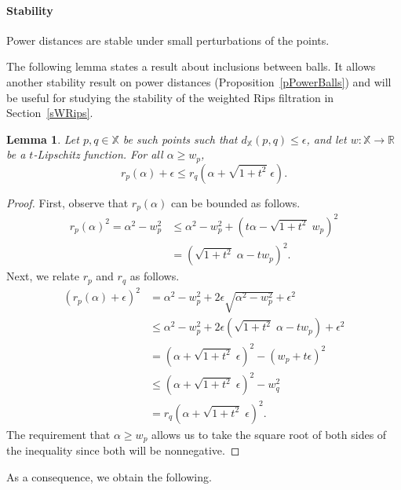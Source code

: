 \documentclass[a4paper]{article}
\newcommand\X{\mathbb{X}}
\newcommand\R{\mathbb{R}}
\newcommand\dX[2]{d_\X(#1,#2)}
\newtheorem{lemma}[theorem]{Lemma}
\begin{document}
\paragraph{Stability\\}
Power distances are stable under small perturbations of the points.



The following lemma states a result about inclusions between balls.
It allows another stability result on power distances (Proposition~\ref{pPowerBalls}) and will be useful for studying the stability of the weighted Rips filtration in Section~\ref{sWRips}.

  \begin{lemma}\label{lPowerBalls}
    Let $p,q\in\X$ be such points such that $\dX{p}{q}\le \epsilon$, and let $w:\X\to\R$ be a $t$-Lipschitz function.
    For all $\alpha \ge w_p$,
    \[
      r_p(\alpha) + \epsilon \le r_q(\alpha+\sqrt{1+t^2}\;\epsilon).
    \]
  \end{lemma}
  \begin{proof}
    First, observe that $r_p(\alpha)$ can be bounded as follows.
    \begin{align*}
      r_p(\alpha)^2
        = \alpha^2 - w_p^2
        &\le \alpha^2 - w_p^2 + (t\alpha - \sqrt{1+t^2}\;w_p)^2\\
        &= (\sqrt{1+t^2}\;\alpha - t w_p)^2.
    \end{align*}
    Next, we relate $r_p$ and $r_q$ as follows.
    \begin{align*}
      (r_p(\alpha)+\epsilon)^2
        & =   \alpha^2 - w_p^2 + 2 \epsilon \sqrt{\alpha^2 - w_p^2} + \epsilon^2\\
        & \le \alpha^2 - w_p^2 + 2 \epsilon (\sqrt{1+t^2}\;\alpha - t w_p) + \epsilon^2\\
& =   (\alpha + \sqrt{1+t^2}\;\epsilon)^2 - (w_p + t \epsilon)^2\\
        & \le (\alpha+\sqrt{1+t^2}\;\epsilon)^2-w_q^2\\
        & =   r_q(\alpha+\sqrt{1+t^2}\;\epsilon)^2.
    \end{align*}
    The requirement that $\alpha \ge w_p$ allows us to take the square root of both sides of the inequality since both will be nonnegative.
  \end{proof}
\noindent
  As a consequence, we obtain the following.
\end{document}
